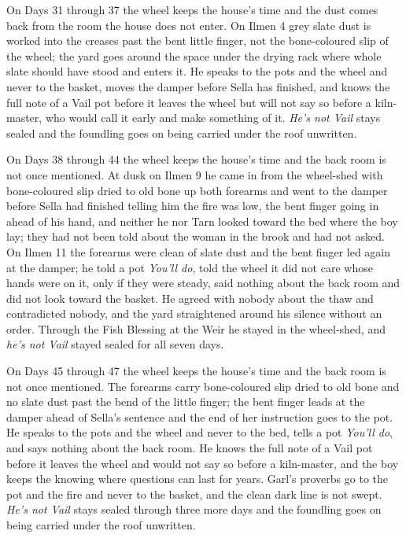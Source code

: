 \documentclass{design/chronicle}
\begin{document}
{On Days 31 through 37 the wheel keeps the house’s time and the dust comes back from the room the house does not enter. On Ilmen 4 grey slate dust is worked into the creases past the bent little finger, not the bone-coloured slip of the wheel; the yard goes around the space under the drying rack where whole slate should have stood and enters it. He speaks to the pots and the wheel and never to the basket, moves the damper before Sella has finished, and knows the full note of a Vail pot before it leaves the wheel but will not say so before a kiln-master, who would call it early and make something of it. \emph{He’s not Vail} stays sealed and the foundling goes on being carried under the roof unwritten.

On Days 38 through 44 the wheel keeps the house’s time and the back room is not once mentioned. At dusk on Ilmen 9 he came in from the wheel-shed with bone-coloured slip dried to old bone up both forearms and went to the damper before Sella had finished telling him the fire was low, the bent finger going in ahead of his hand, and neither he nor Tarn looked toward the bed where the boy lay; they had not been told about the woman in the brook and had not asked. On Ilmen 11 the forearms were clean of slate dust and the bent finger led again at the damper; he told a pot \emph{You’ll do}, told the wheel it did not care whose hands were on it, only if they were steady, said nothing about the back room and did not look toward the basket. He agreed with nobody about the thaw and contradicted nobody, and the yard straightened around his silence without an order. Through the Fish Blessing at the Weir he stayed in the wheel-shed, and \emph{he’s not Vail} stayed sealed for all seven days.

On Days 45 through 47 the wheel keeps the house’s time and the back room is not once mentioned. The forearms carry bone-coloured slip dried to old bone and no slate dust past the bend of the little finger; the bent finger leads at the damper ahead of Sella’s sentence and the end of her instruction goes to the pot. He speaks to the pots and the wheel and never to the bed, tells a pot \emph{You’ll do}, and says nothing about the back room. He knows the full note of a Vail pot before it leaves the wheel and would not say so before a kiln-master, and the boy keeps the knowing where questions can last for years. Garl’s proverbs go to the pot and the fire and never to the basket, and the clean dark line is not swept. \emph{He’s not Vail} stays sealed through three more days and the foundling goes on being carried under the roof unwritten.

}
\end{document}
